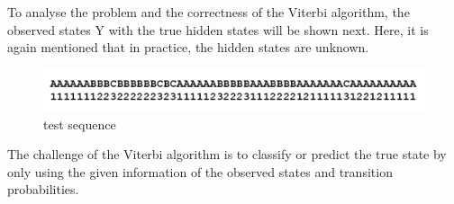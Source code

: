 \documentclass[12pt,journal,compsoc]{IEEEtran}
\begin{document}
To analyse the problem and the correctness of the Viterbi algorithm, the observed states Y with the true hidden states will be shown next. Here, it is again mentioned that in practice, the hidden states are unknown. 
\begin{figure}[ht]
	\centering
  \includegraphics[scale=0.33]{figures/sequence.png}
	\caption{test sequence \cite{article:bissantz}}
	\label{figSequence}
\end{figure}

The challenge of the Viterbi algorithm is to classify or predict the true state by only using the given information of the observed states and transition probabilities. 
\end{document}

